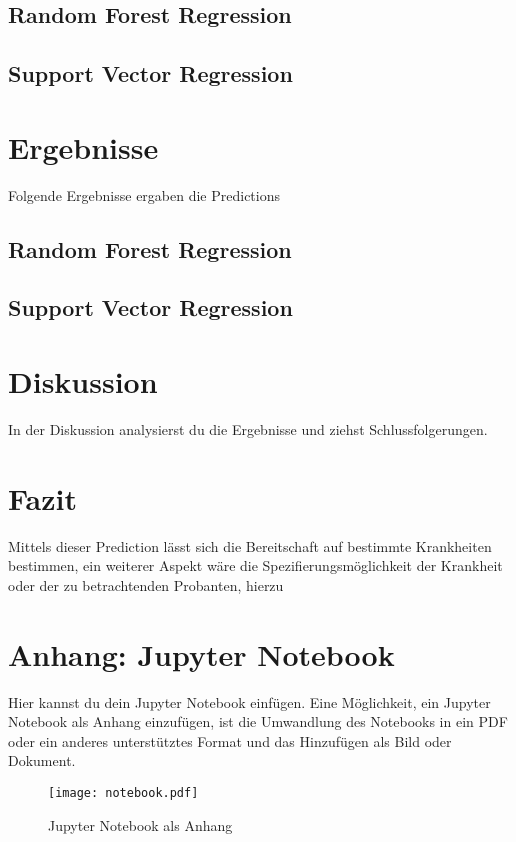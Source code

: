 \documentclass[a4paper,12pt]{article}
\begin{document}
\subsection{Random Forest Regression}
\subsection{Support Vector Regression}
\section{Ergebnisse}
Folgende Ergebnisse ergaben die Predictions
\subsection{Random Forest Regression}
\subsection{Support Vector Regression}
\section{Diskussion}
In der Diskussion analysierst du die Ergebnisse und ziehst Schlussfolgerungen.

\section{Fazit}
Mittels dieser Prediction lässt sich die Bereitschaft auf bestimmte Krankheiten bestimmen, ein weiterer Aspekt wäre die
Spezifierungsmöglichkeit der Krankheit oder der zu betrachtenden Probanten, hierzu
\newpage

\appendix
\section{Anhang: Jupyter Notebook}
Hier kannst du dein Jupyter Notebook einfügen. Eine Möglichkeit, ein Jupyter Notebook als Anhang einzufügen, ist die Umwandlung des Notebooks in ein PDF oder ein anderes unterstütztes Format und das Hinzufügen als Bild oder Dokument.

\begin{figure}[h!]
    \centering
    \texttt{[image: notebook.pdf]}
    \caption{Jupyter Notebook als Anhang}
\end{figure}
\end{document}
